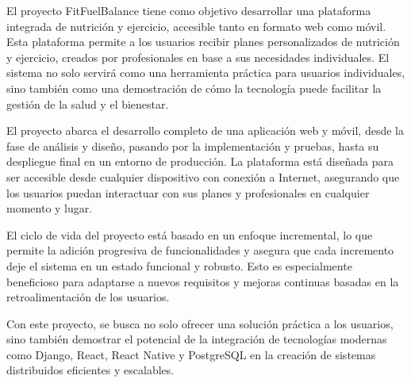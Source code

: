 El proyecto FitFuelBalance tiene como objetivo desarrollar una plataforma integrada de nutrición y ejercicio, accesible tanto en formato web como móvil. Esta plataforma permite a los usuarios recibir planes personalizados de nutrición y ejercicio, creados por profesionales en base a sus necesidades individuales. El sistema no solo servirá como una herramienta práctica para usuarios individuales, sino también como una demostración de cómo la tecnología puede facilitar la gestión de la salud y el bienestar.

El proyecto abarca el desarrollo completo de una aplicación web y móvil, desde la fase de análisis y diseño, pasando por la implementación y pruebas, hasta su despliegue final en un entorno de producción. La plataforma está diseñada para ser accesible desde cualquier dispositivo con conexión a Internet, asegurando que los usuarios puedan interactuar con sus planes y profesionales en cualquier momento y lugar.

El ciclo de vida del proyecto está basado en un enfoque incremental, lo que permite la adición progresiva de funcionalidades y asegura que cada incremento deje el sistema en un estado funcional y robusto. Esto es especialmente beneficioso para adaptarse a nuevos requisitos y mejoras continuas basadas en la retroalimentación de los usuarios.

Con este proyecto, se busca no solo ofrecer una solución práctica a los usuarios, sino también demostrar el potencial de la integración de tecnologías modernas como Django, React, React Native y PostgreSQL en la creación de sistemas distribuidos eficientes y escalables.